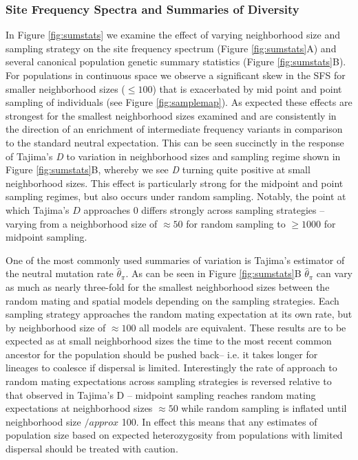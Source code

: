 \documentclass[11pt,twoside,lineno]{preprint}
\begin{document}
\subsubsection{Site Frequency Spectra and Summaries of Diversity}
In Figure \ref{fig:sumstats} we examine the effect of varying neighborhood size and sampling strategy on the site frequency spectrum (Figure \ref{fig:sumstats}A) and several canonical population genetic summary statistics (Figure \ref{fig:sumstats}B). For populations in continuous space we observe a significant skew in the SFS for smaller neighborhood sizes ($\leq 100$) that is exacerbated by mid point and point sampling of individuals (see Figure \ref{fig:samplemap}). As expected these effects are strongest for the smallest neighborhood sizes examined and are consistently in the direction of an enrichment of intermediate frequency variants in comparison to the standard neutral expectation. This can be seen succinctly in the response of Tajima's \textit{D} to variation in neighborhood sizes and sampling regime shown in Figure \ref{fig:sumstats}B, whereby we see \textit{D} turning quite positive at small neighborhood sizes. This effect is particularly strong for the midpoint and point sampling regimes, but also occurs under random sampling. Notably, the point at which Tajima's $D$ approaches 0 differs strongly across sampling strategies -- varying from a neighborhood size of $\approx50$ for random sampling to $\geq1000$ for midpoint sampling. 

One of the most commonly used summaries of variation is Tajima's estimator of the neutral mutation rate $\widehat{\theta}_{\pi}$. As can be seen in Figure \ref{fig:sumstats}B $\widehat{\theta}_{\pi}$ can vary as much as nearly three-fold for the smallest neighborhood sizes between the random mating and spatial models depending on the sampling strategies. Each sampling strategy approaches the random mating expectation at its own rate, but by neighborhood size of $\approx 100$ all models are equivalent. These results are to be expected as at small neighborhood sizes the time to the most recent common ancestor for the population should be pushed back-- i.e. it takes longer for lineages to coalesce if dispersal is limited. Interestingly the rate of approach to random mating expectations across sampling strategies is reversed relative to that observed in Tajima's D -- midpoint sampling reaches random mating expectations at neighborhood sizes $\approx50$ while random sampling is inflated until neighborhood size $/approx$ 100. In effect this means that any estimates of population size based on expected heterozygosity from populations with limited dispersal should be treated with caution. 
\end{document}
